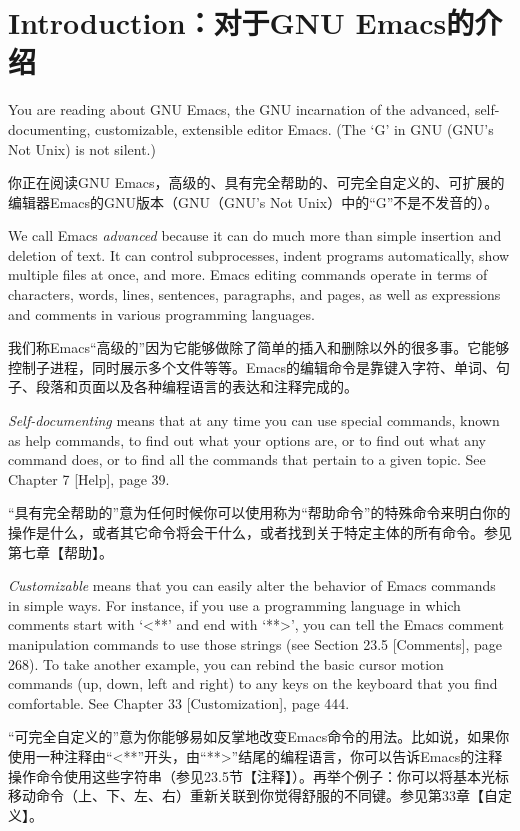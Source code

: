 \chapter{Introduction：对于GNU Emacs的介绍}
You are reading about GNU Emacs, the GNU incarnation of the advanced, self-documenting, customizable, extensible editor Emacs. (The ‘G’ in GNU (GNU’s Not Unix) is not silent.)\par
你正在阅读GNU Emacs，高级的、具有完全帮助的、可完全自定义的、可扩展的编辑器Emacs的GNU版本（GNU（GNU's Not Unix）中的“G”不是不发音的）。\par
We call Emacs \textit{advanced} because it can do much more than simple insertion and deletion of text. It can control subprocesses, indent programs automatically, show multiple files at once, and more. Emacs editing commands operate in terms of characters, words, lines, sentences, paragraphs, and pages, as well as expressions and comments in various programming languages.\par
我们称Emacs“高级的”因为它能够做除了简单的插入和删除以外的很多事。它能够控制子进程，同时展示多个文件等等。Emacs的编辑命令是靠键入字符、单词、句子、段落和页面以及各种编程语言的表达和注释完成的。\par
\textit{Self-documenting} means that at any time you can use special commands, known as help commands, to find out what your options are, or to find out what any command does, or to find all the commands that pertain to a given topic. See Chapter 7 [Help], page 39.\par
“具有完全帮助的”意为任何时候你可以使用称为“帮助命令”的特殊命令来明白你的操作是什么，或者其它命令将会干什么，或者找到关于特定主体的所有命令。参见第七章【帮助】。\par
\textit{Customizable} means that you can easily alter the behavior of Emacs commands in simple ways. For instance, if you use a programming language in which comments start with ‘<**’ and end with ‘**>’, you can tell the Emacs comment manipulation commands to use those strings (see Section 23.5 [Comments], page 268). To take another example, you can rebind the basic cursor motion commands (up, down, left and right) to any keys on the keyboard that you find comfortable. See Chapter 33 [Customization], page 444.\par
“可完全自定义的”意为你能够易如反掌地改变Emacs命令的用法。比如说，如果你使用一种注释由“<**”开头，由“**>”结尾的编程语言，你可以告诉Emacs的注释操作命令使用这些字符串（参见23.5节【注释】）。再举个例子：你可以将基本光标移动命令（上、下、左、右）重新关联到你觉得舒服的不同键。参见第33章【自定义】。\par
